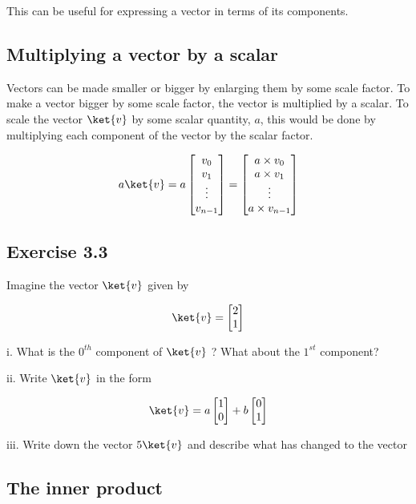\documentclass{book}
\begin{document}
This can be useful for expressing a vector in terms of its components. 

\subsection{ Multiplying a vector by a scalar }

Vectors can be made smaller or bigger by enlarging them by some scale factor. To make a vector bigger by some scale factor, the vector is multiplied by a scalar. To scale the vector $\ket{v}$ by some scalar quantity, $a$, this would be done by multiplying each component of the vector by the scalar factor. 

$$
a \ket{v} = a\begin{bmatrix} v_0 \\ v_1 \\ \vdots \\ v_{n-1} \end{bmatrix} = \begin{bmatrix} a \times v_0 \\ a \times v_1 \\ \vdots \\ a \times v_{n-1} \end{bmatrix} 
$$

\subsection{Exercise 3.3}

Imagine the vector $\ket{v}$ given by 

$$\ket{v} = \begin{bmatrix} 2 \\ 1 \end{bmatrix}$$

i. What is the $0^{th}$ component of $\ket{v}$ ? What about the $1^{st}$ component?

ii. Write $\ket{v}$ in the form 

$$
\ket{v} = a\begin{bmatrix} 1 \\ 0 \end{bmatrix} + b \begin{bmatrix} 0 \\ 1 \end{bmatrix}
$$

iii. Write down the vector $5\ket{v}$ and describe what has changed to the vector  


\subsection{The inner product}
\end{document}

